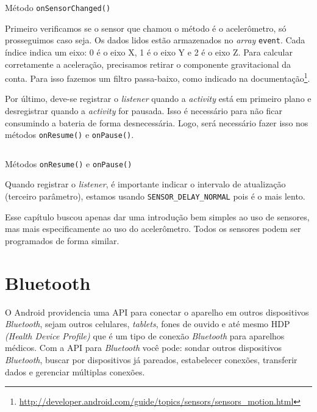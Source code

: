 \documentclass[a4paper,12pt,brazil,oneside]{book}
\begin{document}
	\begin{listing}[H]
	\inputminted[linenos=true,fontsize=\small,frame=lines, framesep=2mm, tabsize=2,numbersep=5pt]{java}{src/api/accelerometer/listener.java}
	\caption{Método \texttt{onSensorChanged()}}
	\label{code:accelonsensorchanged}
	\end{listing} 			
	
	Primeiro verificamos se o sensor que chamou o método é o acelerômetro, só prosseguimos caso seja. Os dados lidos estão armazenados no \emph{array} \texttt{event}. Cada índice indica um eixo: 0 é o eixo X, 1 é o eixo Y e 2 é o eixo Z. Para calcular corretamente a aceleração, precisamos retirar o componente gravitacional da conta. Para isso fazemos um filtro passa-baixo, como indicado na documentação\footnote{\href{http://developer.android.com/guide/topics/sensors/sensors\_motion.html}{http://developer.android.com/guide/topics/sensors/sensors\_motion.html}}.

	Por último, deve-se registrar o \emph{listener} quando a \emph{activity} está em primeiro plano e desregistrar quando a \emph{activity} for pausada. Isso é necessário para não ficar consumindo a bateria de forma desnecessária. Logo, será necessário fazer isso nos métodos \texttt{onResume()} e \texttt{onPause()}.

	\begin{listing}[H]
	\inputminted[linenos=true,fontsize=\small,frame=lines, framesep=2mm, tabsize=2,numbersep=5pt]{java}{src/api/accelerometer/register.java}
	\caption{Métodos \texttt{onResume()} e \texttt{onPause()}}
	\label{code:accelregister}
	\end{listing} 			

	Quando registrar o \emph{listener}, é importante indicar o intervalo de atualização (terceiro parâmetro), estamos usando \texttt{SENSOR\_DELAY\_NORMAL} pois é o mais lento. 
	
	Esse capítulo buscou apenas dar uma introdução bem simples ao uso de sensores, mas mais especificamente ao uso do acelerômetro. Todos os sensores podem ser programados de forma similar. 

\chapter{Bluetooth}

	O Android providencia uma API para conectar o aparelho em outros dispositivos \emph{Bluetooth}, sejam outros celulares, \emph{tablets}, fones de ouvido e até mesmo HDP \emph{(Health Device Profile)} que é um tipo de conexão \emph{Bluetooth} para aparelhos médicos. Com a API para \emph{Bluetooth} você pode: sondar outros dispositivos \emph{Bluetooth}, buscar por dispositivos já pareados, estabelecer conexões, transferir dados e gerenciar múltiplas conexões.
\end{document}
